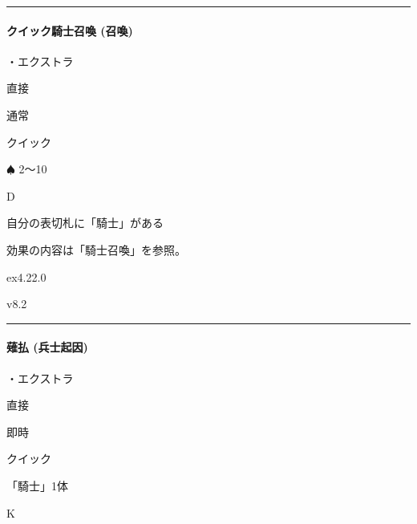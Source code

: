 \documentclass[letterpaper,10pt,dvipdfmx]{sphinxmanual}
\begin{document}
\bigskip\hrule\bigskip



\paragraph{クイック騎士召喚 (召喚)}
\label{\detokenize{auto/frameActionlist:act-quicksummonknight}}\label{\detokenize{auto/frameActionlist:id85}}
\sphinxAtStartPar
{}

\sphinxAtStartPar
・エクストラ

\sphinxAtStartPar
{} 直接

\sphinxAtStartPar
{} 通常

\sphinxAtStartPar
{} クイック

\sphinxAtStartPar
{} {\normalsize $\spadesuit$} 2〜10

\sphinxAtStartPar
{} D

\sphinxAtStartPar
{}

\sphinxAtStartPar
自分の表切札に「騎士」がある

\sphinxAtStartPar
{}

\sphinxAtStartPar
効果の内容は「騎士召喚」を参照。

\sphinxAtStartPar
{}  ex4.22.0

\sphinxAtStartPar
{}  v8.2


\bigskip\hrule\bigskip



\paragraph{薙払 (兵士起因)}
\label{\detokenize{auto/frameActionlist:act-knightsweep}}\label{\detokenize{auto/frameActionlist:id86}}
\sphinxAtStartPar
{}

\sphinxAtStartPar
・エクストラ

\sphinxAtStartPar
{} 直接

\sphinxAtStartPar
{} 即時

\sphinxAtStartPar
{} クイック

\sphinxAtStartPar
{} 「騎士」1体

\sphinxAtStartPar
{} K
\end{document}

